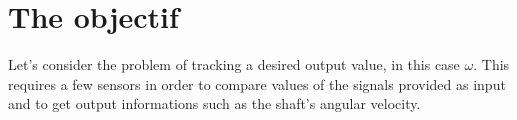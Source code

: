 \section{The objectif}

Let's consider the problem of tracking a desired output value, in this case $\omega$. This requires a few sensors in order to compare values of the signals provided as input and to get output informations such as the shaft's angular velocity. 

